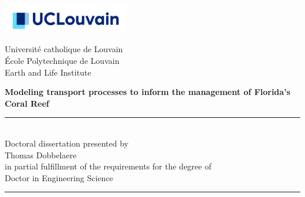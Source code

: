 \thispagestyle{empty}
\begin{minipage}[b]{0.3\textwidth}
\hspace*{-0.8cm}\includegraphics[width=5.5cm]{./figures/logo_ucl.jpg}\vspace{0.35cm}
\end{minipage}
\begin{minipage}[b]{0.69\textwidth}
	\begin{center}
	\hspace*{0.5cm}Université catholique de Louvain\\
	\hspace*{0.5cm}\'Ecole Polytechnique de Louvain\\
	\hspace*{0.5cm} Earth and Life Institute\\
	\end{center}
\end{minipage}


\vspace*{2cm}
\hspace{-0.8cm}
\begin{minipage}{1.02\linewidth}
\centering
\LARGE\bfseries Modeling transport processes to inform the management of Florida's Coral Reef %
\end{minipage}


\vspace*{0.5cm}
\hspace{-0.5cm}\begin{minipage}{\textwidth}
\centering
\rule{50pt}{.5pt}\\[1.2ex]
Doctoral dissertation presented by \\ [2.ex]
{\Large Thomas Dobbelaere\\ [2.ex]
}
in partial fulfillment of the requirements for the degree of\\ [2.ex]
\Large Doctor in Engineering Science

\rule{50pt}{.5pt}\\
\end{minipage}

